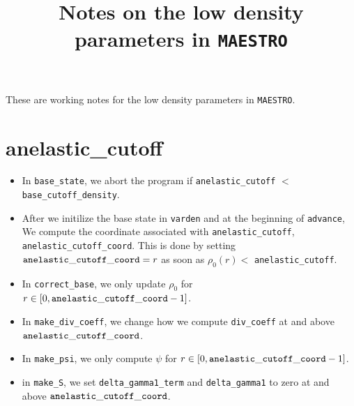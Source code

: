 \documentclass[11pt]{article}
\title{Notes on the low density parameters in {\tt MAESTRO}}
\begin{document}
\maketitle
\tableofcontents

These are working notes for the low density parameters in {\tt MAESTRO}.
\section{anelastic\_cutoff}
\begin{itemize}
\item In {\tt base\_state}, we abort the program if {\tt anelastic\_cutoff} $<$ {\tt base\_cutoff\_density}.
\item After we initilize the base state in {\tt varden} and at the beginning of {\tt advance}, We compute the coordinate associated with {\tt anelastic\_cutoff}, {\tt anelastic\_cutoff\_coord}.  This is done by setting ${\tt anelastic\_cutoff\_coord}= r$ as soon as $\rho_0(r) <$ {\tt anelastic\_cutoff}.
\item In {\tt correct\_base}, we only update $\rho_0$ for $r\in[0,{\tt anelastic\_cutoff\_coord}-1]$.
\item In {\tt make\_div\_coeff}, we change how we compute {\tt div\_coeff} at and above ${\tt anelastic\_cutoff\_coord}$.
\item In {\tt make\_psi}, we only compute $\psi$ for $r\in[0,{\tt anelastic\_cutoff\_coord}-1]$.
\item in {\tt make\_S}, we set {\tt delta\_gamma1\_term} and {\tt delta\_gamma1} to zero at and above ${\tt anelastic\_cutoff\_coord}$.
\end{itemize}
\end{document}
